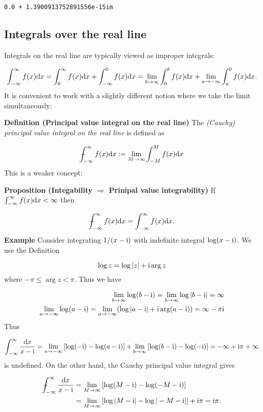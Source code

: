 \documentclass[12pt,landscape]{article}
\def\D{ {\rm d} }
\def\I{ {\rm i} }
\def\Xint#1{ \mathchoice
   {\XXint\displaystyle\textstyle{#1} }%
   {\XXint\textstyle\scriptstyle{#1} }%
   {\XXint\scriptstyle\scriptscriptstyle{#1} }%
   {\XXint\scriptscriptstyle\scriptscriptstyle{#1} }%
   \!\int}
\def\XXint#1#2#3{ {\setbox0=\hbox{$#1{#2#3}{\int}$}
     \vcenter{\hbox{$#2#3$}}\kern-.5\wd0} }
\def\dashint{\Xint-}
\def\infdashint{\dashint_{-\infty}^\infty}
\def\dx{\D x}
\def\br[#1]{\left[{#1}\right]}
\begin{document}
{\begin{lstlisting}
0.0 + 1.3900913752891556e-15im
\end{lstlisting}


\subsection{Integrals over the real line}
Integrals on the real line are typically viewed as improper integrals:

\[
\int_{-\infty}^\infty f(x) \dx = \int_0^\infty f(x) \dx +\int_{-\infty}^0 f(x)\dx =
\lim_{b \rightarrow \infty} \int_0^b f(x) \dx + \lim_{a \rightarrow -\infty} \int_a^0 f(x) \dx.
\]
It is convenient to work with a slightly different notion where we take the limit simultaneously:

\textbf{Definition (Principal value integral on the real line)} The \emph{(Cauchy) principal value integral on the real line} is defined as

\[
\infdashint f(x) \dx := \lim_{M\rightarrow \infty} \int_{-M}^M f(x) \dx
\]
This is a weaker concept:

\textbf{Proposition (Integability $\Rightarrow$ Prinipal value integrability)} If $\int_{-\infty}^\infty f(x) \dx < \infty$ then

\[
\infdashint f(x) \dx = \int_{-\infty}^\infty f(x) \dx.
\]
\newpage
\textbf{Example} Consider integrating $1/(x-\I)$ with indefinite integral $\log(x-\I)$. We use the Definition

\[
\log z = \log |z| + \I \arg z
\]
where $- \pi \leq \arg z < \pi$. Thus we have


\begin{align*}
\lim_{b \rightarrow \infty} \log(b - \I) = \lim_{b \rightarrow \infty} \log|b - \I| = \infty \\
\lim_{a \rightarrow -\infty} \log(a - \I) = \lim_{a \rightarrow -\infty} (\log|a - \I| + \I \arg(a-\I)) = \infty - \pi \I
\end{align*}
Thus

\[
\int_{-\infty}^\infty {\dx \over x - \I} = \lim_{a \rightarrow -\infty} \br[\log(-\I) - \log(a-\I)] +
\lim_{b \rightarrow \infty} \br[\log(b-\I) - \log(-\I)] =  -\infty + \I \pi + \infty
\]
is undefined. On the other hand, the Cauchy principal value integral gives


\begin{align*}
\infdashint {\dx \over x - \I}&  = \lim_{M \rightarrow \infty} \br[\log(M-\I) - \log(-M - \I)] \\
                              & = \lim_{M \rightarrow \infty} \br[\log|M-\I| - \log|-M - \I|]  + \I \pi = \I \pi.
\end{align*}
\newpage
}
\end{document}

